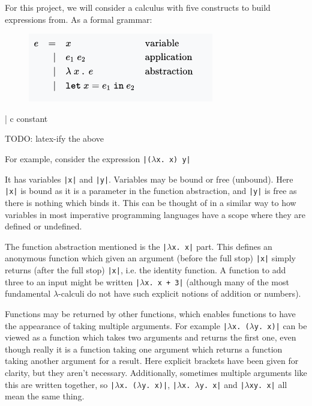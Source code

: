 \documentclass[a4paper,fleqn,12pt]{article}
\begin{document}
For this project, we will consider a calculus with five constructs to build expressions from. As a formal grammar:

\begin{figure}[h!]
  \centering
  \includegraphics[width=0.510\linewidth]{images/image6.png}
\end{figure}
    | c constant

TODO: latex-ify the above

For example, consider the expression \texttt{|($\lambda$x. x) y|}

It has variables \texttt{|x|} and \texttt{|y|}. Variables may be bound or free (unbound). Here \texttt{|x|} is bound as it is a parameter in the function abstraction, and \texttt{|y|} is free as there is nothing which binds it. This can be thought of in a similar way to how variables in most imperative programming languages have a scope where they are defined or undefined.

The function abstraction mentioned is the \texttt{|$\lambda$x. x|} part. This defines an anonymous function which given an argument (before the full stop) \texttt{|x|} simply returns (after the full stop) \texttt{|x|}, i.e. the identity function. A function to add three to an input might be written \texttt{|$\lambda$x. x + 3|} (although many of the most fundamental $\lambda$-calculi do not have such explicit notions of addition or numbers).

Functions may be returned by other functions, which enables functions to have the appearance of taking multiple arguments. For example \texttt{|$\lambda$x. ($\lambda$y. x)|} can be viewed as a function which takes two arguments and returns the first one, even though really it is a function taking one argument which returns a function taking another argument for a result. Here explicit brackets have been given for clarity, but they aren’t necessary. Additionally, sometimes multiple arguments like this are written together, so \texttt{|$\lambda$x. ($\lambda$y. x)|}, \texttt{|$\lambda$x. $\lambda$y. x|} and \texttt{|$\lambda$xy. x|} all mean the same thing.
\end{document}
